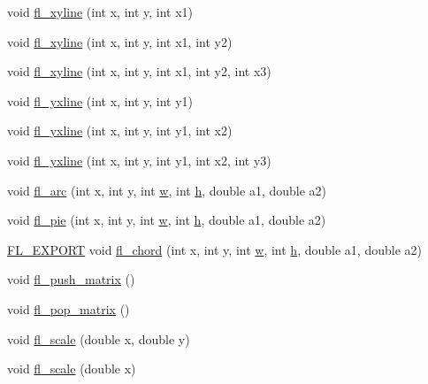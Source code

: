 \begin{DoxyCompactItemize}
\item 
void \hyperlink{group__fl__drawings_gacf46b232b6439424cc7f53656c5c2226}{fl\+\_\+xyline} (int x, int y, int x1)
\item 
void \hyperlink{group__fl__drawings_gaadf217672cf4e471ee184fab70736666}{fl\+\_\+xyline} (int x, int y, int x1, int y2)
\item 
void \hyperlink{group__fl__drawings_ga5098d1775b59ece7503a2faded1f1d74}{fl\+\_\+xyline} (int x, int y, int x1, int y2, int x3)
\item 
void \hyperlink{group__fl__drawings_ga814eabe0e8adf0a5017299cc2ecc26a1}{fl\+\_\+yxline} (int x, int y, int y1)
\item 
void \hyperlink{group__fl__drawings_ga9f5600eac117f72dd3fcb758729dab50}{fl\+\_\+yxline} (int x, int y, int y1, int x2)
\item 
void \hyperlink{group__fl__drawings_gae2e8c7095fbda86ce7812d7e74f1b153}{fl\+\_\+yxline} (int x, int y, int y1, int x2, int y3)
\item 
void \hyperlink{group__fl__drawings_ga3c1216fb40b6274acff72cca64b86a69}{fl\+\_\+arc} (int x, int y, int \hyperlink{forms_8_h_aac374e320caaadeca4874add33b62af2}{w}, int \hyperlink{forms_8_h_a7e427ba5b307f9068129699250690066}{h}, double a1, double a2)
\item 
void \hyperlink{group__fl__drawings_gab4085aba3817a699ad98e1c80f91b69a}{fl\+\_\+pie} (int x, int y, int \hyperlink{forms_8_h_aac374e320caaadeca4874add33b62af2}{w}, int \hyperlink{forms_8_h_a7e427ba5b307f9068129699250690066}{h}, double a1, double a2)
\item 
\hyperlink{_fl___export_8_h_aa9ba29a18aee9d738370a06eeb4470fc}{F\+L\+\_\+\+E\+X\+P\+O\+RT} void \hyperlink{group__fl__drawings_ga607deaaf470293e97c2548266ea73e43}{fl\+\_\+chord} (int x, int y, int \hyperlink{forms_8_h_aac374e320caaadeca4874add33b62af2}{w}, int \hyperlink{forms_8_h_a7e427ba5b307f9068129699250690066}{h}, double a1, double a2)
\item 
void \hyperlink{group__fl__drawings_gac6aa24b9ddc4d79a2e357ea812563a91}{fl\+\_\+push\+\_\+matrix} ()
\item 
void \hyperlink{group__fl__drawings_gab002201c2d4dfd87f82c3bd039d92ecc}{fl\+\_\+pop\+\_\+matrix} ()
\item 
void \hyperlink{group__fl__drawings_ga60522372d52422ab427d540d375a43ad}{fl\+\_\+scale} (double x, double y)
\item 
void \hyperlink{group__fl__drawings_ga055ef231c1621acbd571c12b995676f0}{fl\+\_\+scale} (double x)
\item 

\end{DoxyCompactItemize}
